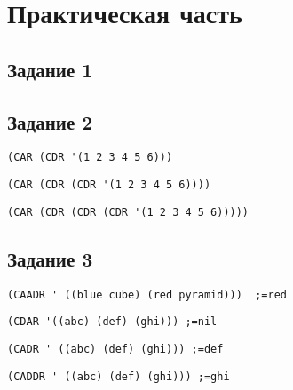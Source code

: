 \chapter{Практическая часть}
\section{Задание 1}
\begin{center}	
	\centering
	\def\svgwidth{12cm}
	
	\label{ris:NRL1}
\end{center}
\begin{center}	
	\centering
	\def\svgwidth{14cm}
	
	\label{ris:NRL2}
\end{center}
\section{Задание 2}
\begin{center}
	\begin{lstlisting}[label=b, caption={Выражение 1}]
(CAR (CDR '(1 2 3 4 5 6))) 
	\end{lstlisting}
	\begin{lstlisting}[label=a, caption={Выражение 2}]
(CAR (CDR (CDR '(1 2 3 4 5 6)))) 	
\end{lstlisting}
	\begin{lstlisting}[label=c, caption={Выражение 3}]
(CAR (CDR (CDR (CDR '(1 2 3 4 5 6))))) 
\end{lstlisting}
\end{center}
\section{Задание 3}
\begin{center}
	\begin{lstlisting}[label=b3, caption={Выражение 1}]
(CAADR ' ((blue cube) (red pyramid)))  ;=red
	\end{lstlisting}
	\begin{lstlisting}[label=a3, caption={Выражение 2}]
(CDAR '((abc) (def) (ghi))) ;=nil
	\end{lstlisting}
	\begin{lstlisting}[label=c3, caption={Выражение 3}]
(CADR ' ((abc) (def) (ghi))) ;=def
	\end{lstlisting}
\begin{lstlisting}[label=d3, caption={Выражение 4}]
(CADDR ' ((abc) (def) (ghi))) ;=ghi
\end{lstlisting}
\end{center}
